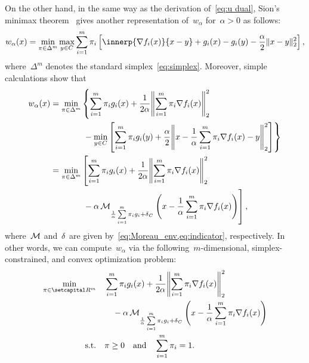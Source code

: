 \documentclass[../../main]{subfiles}
\begin{document}
            On the other hand, in the same way as the derivation of~\cref{eq:u dual}, Sion's minimax theorem~\cite{Sion1958} gives another representation of~$w_\alpha$ for~$\alpha > 0$ as follows:
            \begin{equation} \label{eq:w_alpha Sion}
                w_\alpha(x) = \min_{\pi \in \Delta^m} \max_{y \in C} \sum_{i = 1}^{m} \pi_i \left[ \innerp{\nabla f_i(x)}{x - y} + g_i(x) - g_i(y) - \frac{\alpha}{2} \norm{x - y}_2^2 \right] 
            ,\end{equation} 
            where~$\Delta^m$ denotes the standard simplex~\cref{eq:simplex}.
            Moreover, simple calculations show that
            \begin{equation} \label{eq:w_alpha dual}
                \begin{alignedat}{2}
                    w_\alpha(x) &= \min_{\pi \in \Delta^m} &&\left\{ \sum_{i = 1}^{m} \pi_i g_i(x) + \frac{1}{2 \alpha} \norm*{\sum_{i = 1}^{m} \pi_i \nabla f_i(x)}_2^2 \right. \\
                                &&& \left. {}- \min_{y \in C} \left[ \sum_{i = 1}^{m} \pi_i g_i(y) + \frac{\alpha}{2} \norm*{x - \frac{1}{\alpha} \sum_{i = 1}^{m} \pi_i \nabla f_i(x) - y}_2^2 \right] \right\} \\
                                &= \min_{\pi \in \Delta^m} &&\left[ \sum_{i = 1}^{m} \pi_i g_i(x) + \frac{1}{2 \alpha} \norm*{\sum_{i = 1}^{m} \pi_i \nabla f_i(x)}_2^2 \right. \\
                                &&& \left. {}- \alpha \envelope_{\frac{1}{\alpha} \sum\limits_{i = 1}^{m} \pi_i g_i + \indicator_C} \left( x - \frac{1}{\alpha} \sum_{i = 1}^{m} \pi_i \nabla f_i(x) \right) \right]
                            ,\end{alignedat}
                        \end{equation} 
                        where~$\operatorname{\mathcal{M}}$ and~$\operatorname{\delta}$ are given by~\cref{eq:Moreau_env,eq:indicator}, respectively.
                        In other words, we can compute~$w_\alpha$ via the following~$m$-dimensional, simplex-constrained, and convex optimization problem:
                        \begin{equation} \label{eq:dual_reg_lin_gap}
                            \begin{aligned}
                                \min_{\pi \in \setR^m} &&& \sum_{i = 1}^{m} \pi_i g_i(x) + \frac{1}{2 \alpha} \norm*{\sum_{i = 1}^{m} \pi_i \nabla f_i(x)}_2^2 \\
                                                       &&&\quad - \alpha \envelope_{\frac{1}{\alpha} \sum\limits_{i = 1}^{m} \pi_i g_i + \indicator_C}\left( x - \frac{1}{\alpha} \sum_{i = 1}^{m} \pi_i \nabla f_i(x) \right)  \\
                                \st &&& \pi \ge 0 \eqand \sum_{i = 1}^{m} \pi_i = 1 
                            .\end{aligned}
                        \end{equation} 
\end{document}
